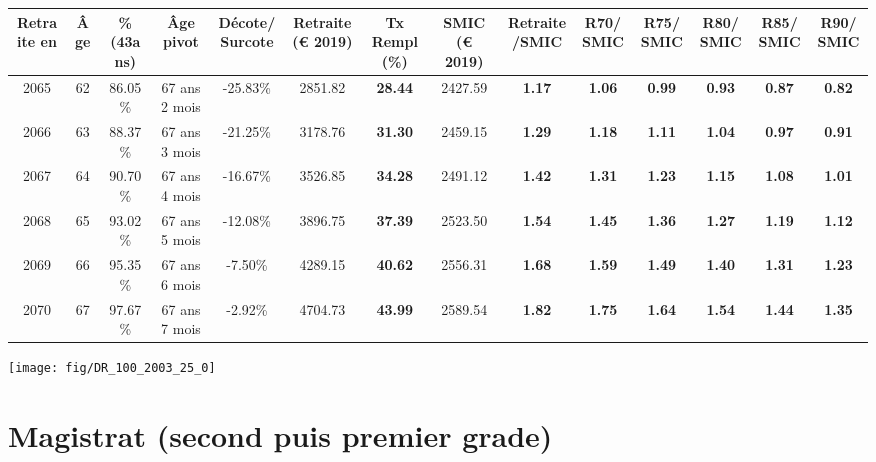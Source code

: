 \begin{adjustbox}{max width=\textwidth} 
\begin{tabular}[htb]{|c|c||c|c|c||c|c||c|c||c|c|c|c|c|} 
\hline 
 Retraite en &  Âge &  \%(43ans) &  Âge pivot &  Décote/Surcote &  Retraite (\euro{} 2019) &  Tx Rempl(\%) &  SMIC (\euro{} 2019) &  Retraite/SMIC &  R70/SMIC &  R75/SMIC &  R80/SMIC &  R85/SMIC &  R90/SMIC \\ 
\hline \hline 
 2065 &  62 &  86.05\% &  67 ans 2 mois &  -25.83\% &  2851.82 &  {\bf 28.44} &  2427.59 &  {\bf 1.17} &  {\bf 1.06} &  {\bf {\color{red} 0.99}} &  {\bf {\color{red} 0.93}} &  {\bf {\color{red} 0.87}} &  {\bf {\color{red} 0.82}} \\ 
\hline 
 2066 &  63 &  88.37\% &  67 ans 3 mois &  -21.25\% &  3178.76 &  {\bf 31.30} &  2459.15 &  {\bf 1.29} &  {\bf 1.18} &  {\bf 1.11} &  {\bf 1.04} &  {\bf {\color{red} 0.97}} &  {\bf {\color{red} 0.91}} \\ 
\hline 
 2067 &  64 &  90.70\% &  67 ans 4 mois &  -16.67\% &  3526.85 &  {\bf 34.28} &  2491.12 &  {\bf 1.42} &  {\bf 1.31} &  {\bf 1.23} &  {\bf 1.15} &  {\bf 1.08} &  {\bf 1.01} \\ 
\hline 
 2068 &  65 &  93.02\% &  67 ans 5 mois &  -12.08\% &  3896.75 &  {\bf 37.39} &  2523.50 &  {\bf 1.54} &  {\bf 1.45} &  {\bf 1.36} &  {\bf 1.27} &  {\bf 1.19} &  {\bf 1.12} \\ 
\hline 
 2069 &  66 &  95.35\% &  67 ans 6 mois &  -7.50\% &  4289.15 &  {\bf 40.62} &  2556.31 &  {\bf 1.68} &  {\bf 1.59} &  {\bf 1.49} &  {\bf 1.40} &  {\bf 1.31} &  {\bf 1.23} \\ 
\hline 
 2070 &  67 &  97.67\% &  67 ans 7 mois &  -2.92\% &  4704.73 &  {\bf 43.99} &  2589.54 &  {\bf 1.82} &  {\bf 1.75} &  {\bf 1.64} &  {\bf 1.54} &  {\bf 1.44} &  {\bf 1.35} \\ 
\hline 
\hline 
\end{tabular} 
\end{adjustbox} 
 
 \vspace{0.1cm} 

 {\hspace{-2.2cm}\texttt{[image: fig/DR\_100\_2003\_25\_0]}} 

\newpage 
 
\chapter{Magistrat (second puis premier grade)} 

